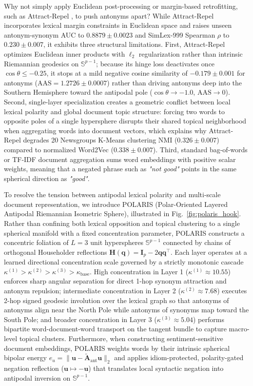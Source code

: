 \documentclass[journal]{IEEEtran}
\begin{document}
Why not simply apply Euclidean post-processing or margin-based retrofitting, such as Attract-Repel \cite{mrksic2017semantic}, to push antonyms apart? While Attract-Repel incorporates lexical margin constraints in Euclidean space and raises unseen antonym-synonym AUC to $0.8879 \pm 0.0023$ and SimLex-999 Spearman $\rho$ to $0.230 \pm 0.007$, it exhibits three structural limitations. First, Attract-Repel optimizes Euclidean inner products with $\ell_2$ regularization rather than intrinsic Riemannian geodesics on $\mathbb{S}^{p-1}$; because its hinge loss deactivates once $\cos\theta \le -0.25$, it stops at a mild negative cosine similarity of $-0.179 \pm 0.001$ for antonyms ($\text{AAS} = 1.2726 \pm 0.0007$) rather than driving antonyms deep into the Southern Hemisphere toward the antipodal pole ($\cos\theta \to -1.0$, $\text{AAS} \to 0$). Second, single-layer specialization creates a geometric conflict between local lexical polarity and global document topic structure: forcing two words to opposite poles of a single hypersphere disrupts their shared topical neighborhood when aggregating words into document vectors, which explains why Attract-Repel degrades 20 Newsgroups K-Means clustering NMI ($0.326 \pm 0.007$) compared to normalized Word2Vec ($0.338 \pm 0.007$). Third, standard bag-of-words or TF-IDF document aggregation sums word embeddings with positive scalar weights, meaning that a negated phrase such as \textit{"not good"} points in the same spherical direction as \textit{"good"}.

To resolve the tension between antipodal lexical polarity and multi-scale document representation, we introduce POLARIS (Polar-Oriented Layered Antipodal Riemannian Isometric Sphere), illustrated in Fig.~\ref{fig:polaris_hook}. Rather than confining both lexical opposition and topical clustering to a single spherical manifold with a fixed concentration parameter, POLARIS constructs a concentric foliation of $L = 3$ unit hyperspheres $\mathbb{S}^{p-1}$ connected by chains of orthogonal Householder reflections $\mathbf{H}(\mathbf{q}) = \mathbf{I}_p - 2\mathbf{q}\mathbf{q}^\top$. Each layer operates at a learned directional concentration scale governed by a strictly monotonic cascade $\kappa^{(1)} > \kappa^{(2)} > \kappa^{(3)} > \kappa_{\text{base}}$. High concentration in Layer 1 ($\kappa^{(1)} \approx 10.55$) enforces sharp angular separation for direct 1-hop synonym attraction and antonym repulsion; intermediate concentration in Layer 2 ($\kappa^{(2)} \approx 7.68$) executes 2-hop signed geodesic involution over the lexical graph so that antonyms of antonyms align near the North Pole while antonyms of synonyms map toward the South Pole; and broader concentration in Layer 3 ($\kappa^{(3)} \approx 5.04$) performs bipartite word-document-word transport on the tangent bundle to capture macro-level topical clusters. Furthermore, when constructing sentiment-sensitive document embeddings, POLARIS weights words by their intrinsic spherical bipolar energy $e_u = \|\mathbf{u} - \tilde{\mathbf{A}}_{\text{ant}}\mathbf{u}\|_2$ and applies idiom-protected, polarity-gated negation reflection ($\mathbf{u} \mapsto -\mathbf{u}$) that translates local syntactic negation into antipodal inversion on $\mathbb{S}^{p-1}$.
\end{document}
